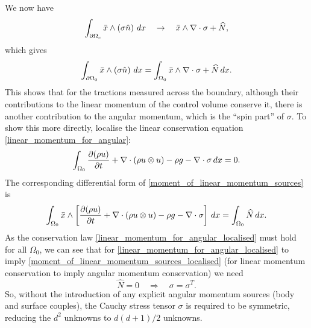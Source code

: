 We now have
\begin{equation}
    \int_{{\partial\Omega}_c} \bar{x}\wedge\left(\sigma\hat{n}\right)\,dx \quad\rightarrow\quad
    \bar{x}\wedge \nabla\cdot \sigma + \widehat{N},
\end{equation}
which gives 
\begin{equation}
    \int_{{\partial\Omega_0}} \bar{x} \wedge \left(\sigma\hat{n}\right)\,dx = \int_{\Omega_0} \bar{x}\wedge\nabla\cdot\sigma + \widehat{N}\,dx.
\end{equation}
This shows that for the tractions measured across the boundary, although their contributions to the linear momentum of the control volume conserve it,
there is another contribution to the angular momentum, which is the ``spin part'' of $\sigma$.
To show this more directly, localise the linear conservation equation \eqref{linear_momentum_for_angular}:
\begin{equation}\label{linear_momentum_for_angular_localised}
    \int_{{\Omega_0}} \frac{\partial (\rho u)}{\partial t} + \nabla\cdot\left(\rho u\otimes u\right) - \rho g - \nabla\cdot\sigma\,dx = 0.
\end{equation}
The corresponding differential form of \eqref{moment_of_linear_momentum_sources} is
\begin{equation}\label{moment_of_linear_momentum_sources_localised}
    \int_{{\Omega_0}} \bar{x} \wedge \left[\frac{\partial (\rho u)}{\partial t} + \nabla\cdot\left(\rho u\otimes u\right) - \rho g - \nabla\cdot\sigma\right]\,dx
    = \int_{\Omega_0} \widehat{N}\,dx.
\end{equation}
As the conservation law \eqref{linear_momentum_for_angular_localised} must hold for all $\Omega_0$, we can see that for \eqref{linear_momentum_for_angular_localised}
to imply \eqref{moment_of_linear_momentum_sources_localised} (for linear momentum conservation to imply angular momentum conservation) we need
\begin{equation}
    \widehat{N} = 0 \quad\Rightarrow\quad \sigma = \sigma^T.
\end{equation}
So, without the introduction of any explicit angular momentum sources (body and surface couples), the Cauchy stress tensor $\sigma$ is required to be symmetric,
reducing the $d^2$ unknowns to $d(d+1)/2$ unknowns.



